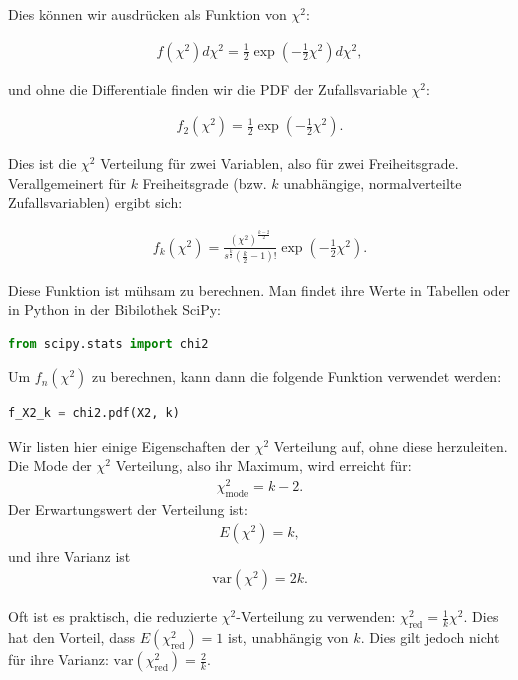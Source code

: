 Dies können wir ausdrücken als Funktion von $\chi^2$:

\begin{align}
f(\chi^2) d\chi^2 = \frac{1}{2}\exp{ \left( - \frac{1}{2} \chi^2 \right)} d\chi^2,
\end{align}

und ohne die Differentiale finden wir die PDF der Zufallsvariable $\chi^2$:

\begin{align}
f_2(\chi^2) = \frac{1}{2}\exp{ \left( - \frac{1}{2} \chi^2 \right)}.
\end{align}

Dies ist die $\chi^2$ Verteilung für zwei Variablen, also für zwei Freiheitsgrade. Verallgemeinert für $k$ Freiheitsgrade (bzw. $k$ unabhängige, normalverteilte Zufallsvariablen) ergibt sich:

\begin{align}
f_k(\chi^2) = \frac{(\chi^2)^\frac{k-2}{2}}{s^\frac{k}{2} \left( \frac{k}{2}-1 \right)!} \exp{ \left( - \frac{1}{2} \chi^2 \right)}.
\end{align}

Diese Funktion ist mühsam zu berechnen. Man findet ihre Werte in Tabellen oder in Python in der Bibilothek SciPy:
\begin{lstlisting}[language = Python]
from scipy.stats import chi2
\end{lstlisting}
Um $f_n(\chi^2)$ zu berechnen, kann dann die folgende Funktion verwendet werden:
\begin{lstlisting}[language = Python]
f_X2_k = chi2.pdf(X2, k)
\end{lstlisting}

Wir listen hier einige Eigenschaften der $\chi^2$ Verteilung auf, ohne diese herzuleiten. Die Mode der $\chi^2$ Verteilung, also ihr Maximum, wird erreicht für: 
\begin{align}
\chi^2_\mathrm{mode} = k-2.
\end{align}
Der Erwartungswert der Verteilung ist:
\begin{align}
E(\chi^2) = k,
\end{align}
und ihre Varianz ist
\begin{align}
\mathrm{var}(\chi^2) = 2k.
\end{align}

Oft ist es praktisch, die reduzierte $\chi^2$-Verteilung zu verwenden: $\chi^2_\mathrm{red}=\frac{1}{k}\chi^2$. Dies hat den Vorteil, dass $E(\chi^2_\mathrm{red}) = 1$ ist, unabhängig von $k$. Dies gilt jedoch nicht für ihre Varianz: $\mathrm{var}(\chi^2_\mathrm{red}) = \frac{2}{k}$.


